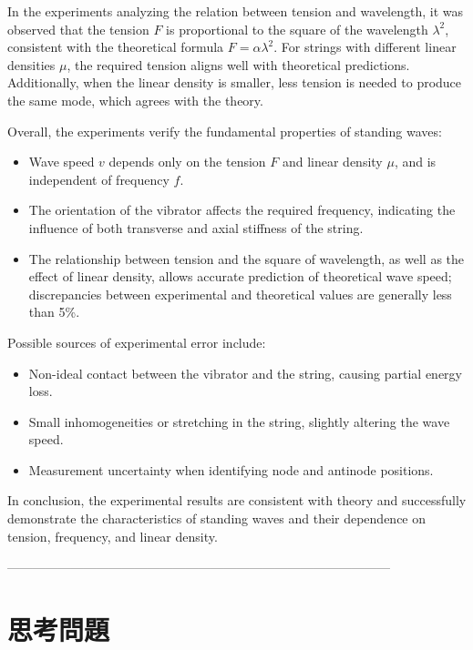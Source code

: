 \documentclass[12pt]{article}
\begin{document}
{In the experiments analyzing the relation between tension and wavelength, it was observed that the tension $F$ is proportional to the square of the wavelength $\lambda^2$, consistent with the theoretical formula $F = \alpha \lambda^2$. For strings with different linear densities $\mu$, the required tension aligns well with theoretical predictions. Additionally, when the linear density is smaller, less tension is needed to produce the same mode, which agrees with the theory.

Overall, the experiments verify the fundamental properties of standing waves:
\begin{itemize}
    \item Wave speed $v$ depends only on the tension $F$ and linear density $\mu$, and is independent of frequency $f$.
    \item The orientation of the vibrator affects the required frequency, indicating the influence of both transverse and axial stiffness of the string.
    \item The relationship between tension and the square of wavelength, as well as the effect of linear density, allows accurate prediction of theoretical wave speed; discrepancies between experimental and theoretical values are generally less than 5\%.
\end{itemize}

Possible sources of experimental error include:
\begin{itemize}
    \item Non-ideal contact between the vibrator and the string, causing partial energy loss.
    \item Small inhomogeneities or stretching in the string, slightly altering the wave speed.
    \item Measurement uncertainty when identifying node and antinode positions.
\end{itemize}

In conclusion, the experimental results are consistent with theory and successfully demonstrate the characteristics of standing waves and their dependence on tension, frequency, and linear density.

\noindent
------------------------------------------------------------------------------------------

\section{\textbf{思考問題}}

}
\end{document}
